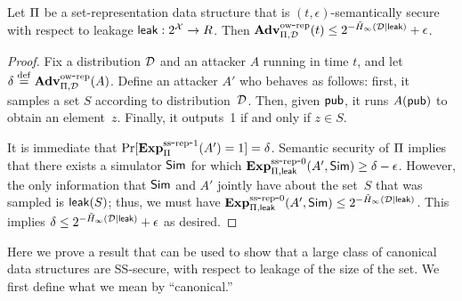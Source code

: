 \begin{theorem}
Let $\Pi$ be a set-representation data structure that is $(t, \epsilon)$-semantically secure
with respect to leakage ${\sf leak}:2^{\cal X} \rightarrow R$.
Then $\mathrm{\mathbf{Adv}}^{\mathrm{ow\mbox{-}rep}}_{\Pi,\mathcal{D}}(t) \leq 2^{-\tilde H_\infty({\cal D} \mid {\sf leak})} + \epsilon$.
\end{theorem}
\begin{proof}
Fix a distribution ${\cal D}$ and an attacker
$A$ running in time $t$, and let $\delta \stackrel{\rm def}{=} \mathrm{\mathbf{Adv}}^{\mathrm{ow\mbox{-}rep}}_{\Pi,\mathcal{D}}(A)$.
Define an attacker $A'$ who behaves as follows: first, it samples a set $S$ according to
distribution~${\cal D}$. Then, given ${\sf pub}$, it runs $A({\sf pub})$ to obtain an element~$z$.
Finally, it outputs~1 if and only if $z \in S$.

It is immediate that $\Pr[\mathrm{\mathbf{Exp}}^{\mathrm{ss\mbox{-}rep\mbox{-}1}}_{\Pi}(A')=1] = \delta$. Semantic
security of $\Pi$ implies that there exists a simulator ${\sf Sim}$ for which
$\mathrm{\mathbf{Exp}}^{\mathrm{ss\mbox{-}rep\mbox{-}0}}_{\Pi, {\sf leak}}(A', {\sf Sim}) \geq \delta - \epsilon$. However,
the only information
that ${\sf Sim}$
and $A'$ jointly have about the set~$S$ that was sampled is ${\sf leak}(S)$; thus,
we must have $\mathrm{\mathbf{Exp}}^{\mathrm{ss\mbox{-}rep\mbox{-}0}}_{\Pi, {\sf leak}}(A', {\sf Sim}) \leq 2^{-\tilde H_\infty({\cal D} \mid {\sf leak})}$.
This implies
$\delta \leq 2^{-\tilde H_\infty({\cal D} \mid {\sf leak})}+\epsilon$ as desired.
\end{proof}


Here we prove a result that can be used to show that a large class of canonical
data structures are SS-secure, with respect to leakage of the size of the set.
We first define what we mean by ``canonical.''


